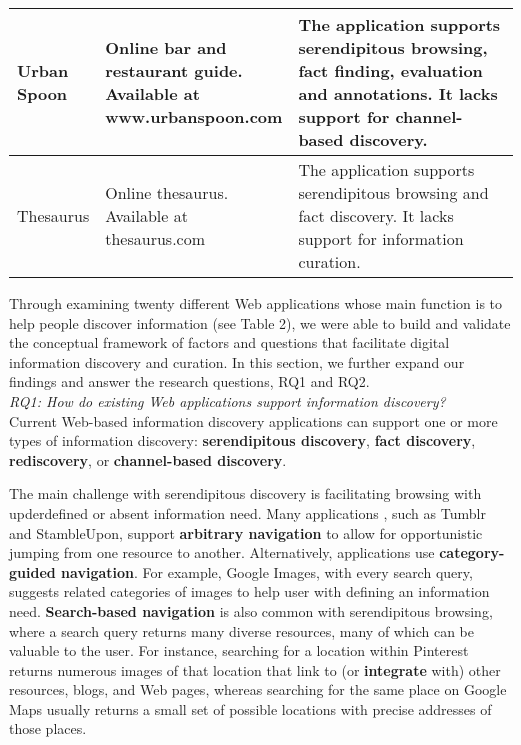\documentclass{casconpaper}
\begin{document}
{\begin{table*}[htbp]
\begin{tabular}{|p{0.11\linewidth}| p{0.22\linewidth}| p{0.67\linewidth}|}
\hline
Urban Spoon     & \raggedright Online bar and restaurant guide. Available at www.urbanspoon.com             & The application supports serendipitous browsing, fact finding, evaluation and annotations. It lacks support for channel-based discovery.  \\
\hline
Thesaurus       & \raggedright Online thesaurus. Available at thesaurus.com                                 & The application supports serendipitous browsing and fact discovery. It lacks support for information curation.                                                                                \\
\hline
\end{tabular}
\end{table*}

Through examining twenty different Web applications whose main function is to help people discover information (see Table 2), we were able to build and validate the conceptual framework of factors and questions that facilitate digital information discovery and curation. In this section, we further expand our findings and answer the research questions, RQ1 and RQ2. \\

\emph{RQ1: How do existing Web applications support information discovery?} \\

Current Web-based information discovery applications can support one or more types of information discovery: \textbf{serendipitous discovery}, \textbf{fact discovery}, \textbf{rediscovery}, or \textbf{channel-based discovery}.

The main challenge with serendipitous discovery is facilitating browsing with upderdefined or absent information need. Many applications , such as Tumblr and StambleUpon, support \textbf{arbitrary navigation} to allow for opportunistic jumping from one resource to another.  Alternatively, applications use \textbf{category-guided navigation}. For example, Google Images, with every search query, suggests related categories of images to help user with defining an information need. \textbf{Search-based navigation} is also common with serendipitous browsing, where a search query returns many diverse resources, many of which can be valuable to the user. For instance, searching for a location within Pinterest returns numerous images of that location that link to (or \textbf{integrate} with) other resources, blogs, and Web pages, whereas searching for the same place on Google Maps usually returns a small set of possible locations with precise addresses of those places. 

}
\end{document}
